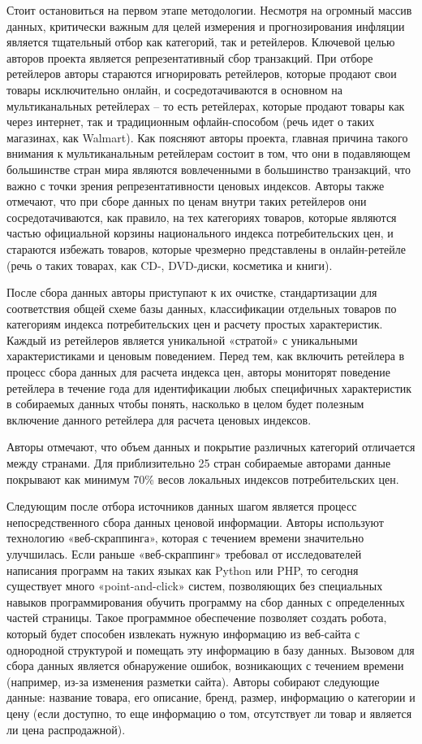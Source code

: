 Стоит остановиться на первом этапе методологии. Несмотря на огромный массив данных, критически важным для целей измерения и прогнозирования инфляции является тщательный отбор как категорий, так и ретейлеров. Ключевой целью авторов проекта является репрезентативный сбор транзакций. При отборе ретейлеров авторы стараются игнорировать ретейлеров, которые продают свои товары исключительно онлайн, и сосредотачиваются в основном на мультиканальных ретейлерах – то есть ретейлерах, которые продают товары как через интернет, так и традиционным офлайн-способом (речь идет о таких магазинах, как Walmart). Как поясняют авторы проекта, главная причина такого внимания к мультиканальным ретейлерам состоит в том, что они в подавляющем большинстве стран мира являются вовлеченными в большинство транзакций, что важно с точки зрения репрезентативности ценовых индексов. Авторы также отмечают, что при сборе данных по ценам внутри таких ретейлеров они сосредотачиваются, как правило, на тех категориях товаров, которые являются частью официальной корзины национального индекса потребительских цен, и стараются избежать товаров, которые чрезмерно представлены в онлайн-ретейле (речь о таких товарах, как CD-, DVD-диски, косметика и книги).

После сбора данных авторы приступают к их очистке, стандартизации для соответствия общей схеме базы данных, классификации отдельных товаров по категориям индекса потребительских цен и расчету простых характеристик. Каждый из ретейлеров является уникальной «стратой» с уникальными характеристиками и ценовым поведением. Перед тем, как включить ретейлера в процесс сбора данных для расчета индекса цен, авторы мониторят поведение ретейлера в течение года для идентификации любых специфичных характеристик в собираемых данных чтобы понять, насколько в целом будет полезным включение данного ретейлера для расчета ценовых индексов.

Авторы отмечают, что объем данных и покрытие различных категорий отличается между странами. Для приблизительно 25 стран собираемые авторами данные покрывают как минимум 70\% весов локальных индексов потребительских цен.

Следующим после отбора источников данных шагом является процесс непосредственного сбора данных ценовой информации. Авторы используют технологию «веб-скраппинга», которая с течением времени значительно улучшилась. Если раньше «веб-скраппинг» требовал от исследователей написания программ на таких языках как Python или PHP, то сегодня существует много «point-and-click» систем, позволяющих без специальных навыков программирования обучить программу на сбор данных с определенных частей страницы. Такое программное обеспечение позволяет создать робота, который будет способен извлекать нужную информацию из веб-сайта с однородной структурой и помещать эту информацию в базу данных. Вызовом для сбора данных является обнаружение ошибок, возникающих с течением времени (например, из-за изменения разметки сайта). Авторы собирают следующие данные: название товара, его описание, бренд, размер, информацию о категории и цену (если доступно, то еще информацию о том, отсутствует ли товар и является ли цена распродажной).

